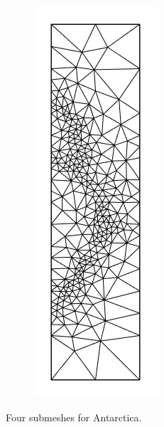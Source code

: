 \documentclass{article}
\begin{document}
\begin{figure}[H]
\begin{subfigure}[b]{0.15\linewidth}
    \caption{}
  \end{subfigure}
  \begin{subfigure}[b]{0.15\linewidth}
    \includegraphics[width=\linewidth]{Fig_submesh4.png}
    \caption{}
  \end{subfigure}
  \caption{Four submeshes for Antarctica.}
\end{figure}
\end{document}
